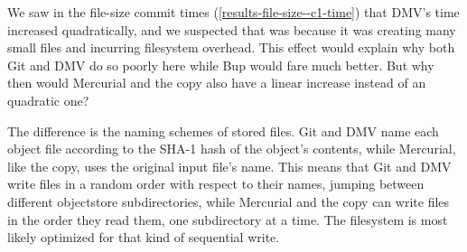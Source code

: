 We saw in the file-size commit times (\autoref{results-file-size--c1-time}) that DMV's time increased quadratically, and we suspected that was because it was creating many small files and incurring filesystem overhead.
This effect would explain why both Git and DMV do so poorly here while Bup would fare much better.
But why then would Mercurial and the copy also have a linear increase instead of an quadratic one?

The difference is the naming schemes of stored files.
Git and DMV name each object file according to the SHA-1 hash of the object's contents, while Mercurial, like the copy, uses the original input file's name.
This means that Git and DMV write files in a random order with respect to their names, jumping between different \gls{objectstore} subdirectories, while Mercurial and the copy can write files in the order they read them, one subdirectory at a time.
The filesystem is most likely optimized for that kind of sequential write.
